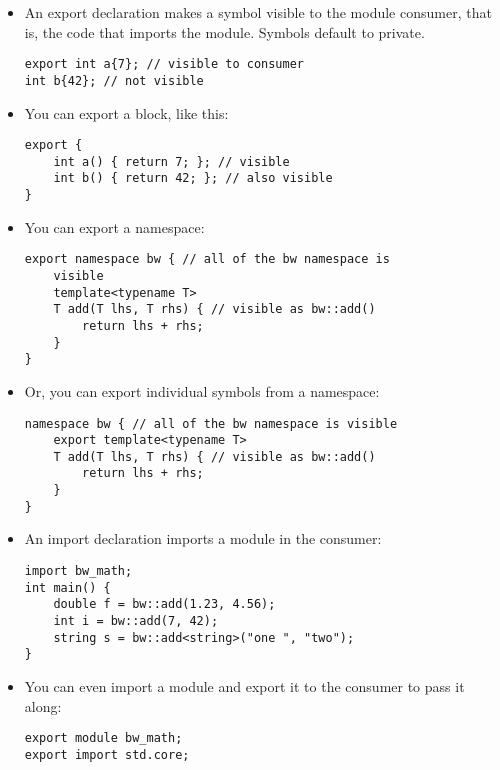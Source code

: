 \begin{itemize}
\item 
An export declaration makes a symbol visible to the module consumer, that is, the code that imports the module. Symbols default to private.

\begin{lstlisting}[style=styleCXX]
export int a{7}; // visible to consumer
int b{42}; // not visible
\end{lstlisting}

\item 
You can export a block, like this:

\begin{lstlisting}[style=styleCXX]
export {
	int a() { return 7; }; // visible
	int b() { return 42; }; // also visible
}
\end{lstlisting}

\item 
You can export a namespace:

\begin{lstlisting}[style=styleCXX]
export namespace bw { // all of the bw namespace is
	visible
	template<typename T>
	T add(T lhs, T rhs) { // visible as bw::add()
		return lhs + rhs;
	}
}
\end{lstlisting}

\item 
Or, you can export individual symbols from a namespace:

\begin{lstlisting}[style=styleCXX]
namespace bw { // all of the bw namespace is visible
	export template<typename T>
	T add(T lhs, T rhs) { // visible as bw::add()
		return lhs + rhs;
	}
}
\end{lstlisting}


\item 
An import declaration imports a module in the consumer:

\begin{lstlisting}[style=styleCXX]
import bw_math;
int main() {
	double f = bw::add(1.23, 4.56);
	int i = bw::add(7, 42);
	string s = bw::add<string>("one ", "two");
}
\end{lstlisting}

\item 
You can even import a module and export it to the consumer to pass it along:

\begin{lstlisting}[style=styleCXX]
export module bw_math;
export import std.core;
\end{lstlisting}


\end{itemize}
